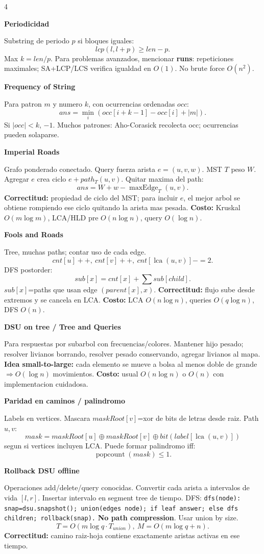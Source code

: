 \documentclass[8pt]{extarticle}
\newcommand{\blk}[2]{%
  \vspace{1.3pt}
  \noindent\colorbox{head}{\parbox{\linewidth-2\fboxsep}{\textbf{#1}}}\par
  {\footnotesize #2}\par
}
\newcommand{\bigO}{O}
\newcommand{\lca}{\operatorname{lca}}
\begin{document}
\begin{multicols}{4}
\blk{Periodicidad}{
Substring de periodo \(p\) si bloques iguales:
\[
lcp(l,l+p)\ge len-p.
\]
Max \(k=len/p\). Para problemas avanzados, mencionar \textbf{runs}: repeticiones maximales; SA+LCP/LCS verifica igualdad en \(\bigO(1)\). No brute force \(\bigO(n^2)\).}

\blk{Frequency of String}{
Para patron \(m\) y numero \(k\), con ocurrencias ordenadas \(occ\):
\[
ans=\min_i(occ[i+k-1]-occ[i]+|m|).
\]
Si \(|occ|<k\), \(-1\). Muchos patrones: Aho-Corasick recolecta occ; ocurrencias pueden solaparse.}

\blk{Imperial Roads}{
Grafo ponderado conectado. Query fuerza arista \(e=(u,v,w)\). MST \(T\) peso \(W\). Agregar \(e\) crea ciclo \(e+path_T(u,v)\). Quitar maxima del path:
\[
ans=W+w-\operatorname{maxEdge}_T(u,v).
\]
\textbf{Correctitud:} propiedad de ciclo del MST; para incluir \(e\), el mejor arbol se obtiene rompiendo ese ciclo quitando la arista mas pesada.
\textbf{Costo:} Kruskal \(\bigO(m\log m)\), LCA/HLD pre \(\bigO(n\log n)\), query \(\bigO(\log n)\).}

\blk{Fools and Roads}{
Tree, muchas paths; contar uso de cada edge.
\[
cnt[u]++,\ cnt[v]++,\ cnt[\lca(u,v)]-=2.
\]
DFS postorder:
\[
sub[x]=cnt[x]+\sum sub[child].
\]
\(sub[x]\)=paths que usan edge \((parent[x],x)\).
\textbf{Correctitud:} flujo sube desde extremos y se cancela en LCA.
\textbf{Costo:} LCA \(\bigO(n\log n)\), queries \(\bigO(q\log n)\), DFS \(\bigO(n)\).}

\blk{DSU on tree / Tree and Queries}{
Para respuestas por subarbol con frecuencias/colores. Mantener hijo pesado; resolver livianos borrando, resolver pesado conservando, agregar livianos al mapa.
\textbf{Idea small-to-large:} cada elemento se mueve a bolsa al menos doble de grande \(\Rightarrow \bigO(\log n)\) movimientos.
\textbf{Costo:} usual \(\bigO(n\log n)\) o \(\bigO(n)\) con implementacion cuidadosa.}

\blk{Paridad en caminos / palindromo}{
Labels en vertices. Mascara \(maskRoot[v]\)=xor de bits de letras desde raiz.
Path \(u,v\):
\[
mask=maskRoot[u]\oplus maskRoot[v]\oplus bit(label[\lca(u,v)])
\]
segun si vertices incluyen LCA. Puede formar palindromo iff:
\[
\operatorname{popcount}(mask)\le 1.
\]}

\blk{Rollback DSU offline}{
Operaciones add/delete/query conocidas. Convertir cada arista a intervalos de vida \([l,r]\). Insertar intervalo en segment tree de tiempo. DFS:
\texttt{dfs(node): snap=dsu.snapshot(); union(edges node); if leaf answer; else dfs children; rollback(snap).}
\textbf{No path compression}. Usar union by size.
\[
T=\bigO(m\log q\cdot T_{union}),\ M=\bigO(m\log q+n).
\]
\textbf{Correctitud:} camino raiz-hoja contiene exactamente aristas activas en ese tiempo.}


\end{multicols}
\end{document}
